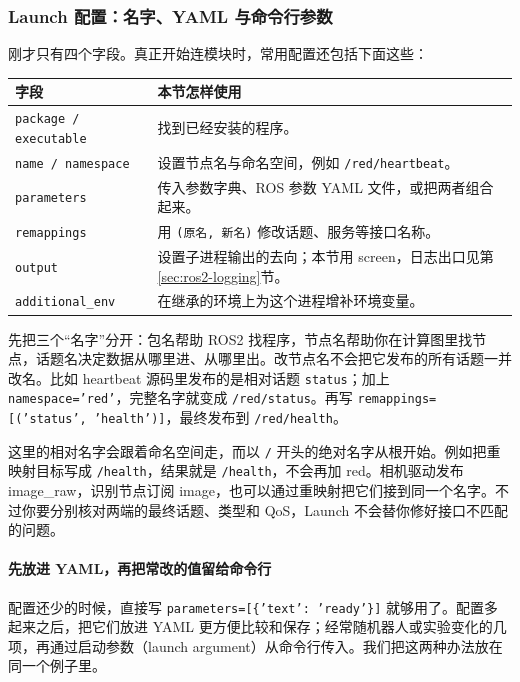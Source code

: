 \subsubsection{Launch 配置：名字、YAML 与命令行参数}
刚才只有四个字段。真正开始连模块时，常用配置还包括下面这些：
\begin{center}
\begin{tabular}{p{}p{}}
\toprule[1.5pt]
字段 & 本节怎样使用 \\
\midrule[1pt]
\texttt{package / executable} & 找到已经安装的程序。\\
\texttt{name / namespace} & 设置节点名与命名空间，例如 \nolinkurl{/red/heartbeat}。\\
\texttt{parameters} & 传入参数字典、ROS 参数 YAML 文件，或把两者组合起来。\\
\texttt{remappings} & 用 \texttt{(原名, 新名)} 修改话题、服务等接口名称。\\
\texttt{output} & 设置子进程输出的去向；本节用 screen，日志出口见第\ref{sec:ros2-logging}节。\\
\texttt{additional\_env} & 在继承的环境上为这个进程增补环境变量。\\
\bottomrule[1.5pt]
\end{tabular}
\end{center}

先把三个“名字”分开：包名帮助 ROS2 找程序，节点名帮助你在计算图里找节点，话题名决定数据从哪里进、从哪里出。改节点名不会把它发布的所有话题一并改名。比如 heartbeat 源码里发布的是相对话题 \texttt{status}；加上 \texttt{namespace='red'}，完整名字就变成 \texttt{/red/status}。再写 \texttt{remappings=[('status', 'health')]}，最终发布到 \texttt{/red/health}。

这里的相对名字会跟着命名空间走，而以 \texttt{/} 开头的绝对名字从根开始。例如把重映射目标写成 \texttt{/health}，结果就是 \texttt{/health}，不会再加 red。相机驱动发布 image\_raw，识别节点订阅 image，也可以通过重映射把它们接到同一个名字。不过你要分别核对两端的最终话题、类型和 QoS，Launch 不会替你修好接口不匹配的问题。

\paragraph*{先放进 YAML，再把常改的值留给命令行}
配置还少的时候，直接写 \texttt{parameters=[\{'text': 'ready'\}]} 就够用了。配置多起来之后，把它们放进 YAML 更方便比较和保存；经常随机器人或实验变化的几项，再通过启动参数（launch argument）从命令行传入。我们把这两种办法放在同一个例子里。

